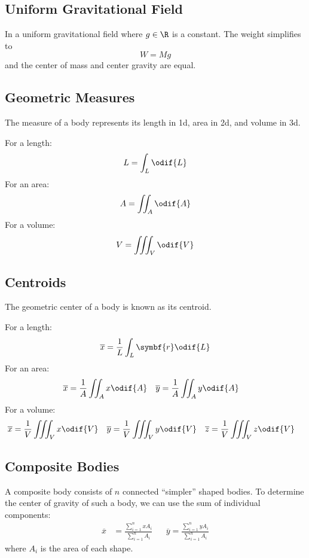 \documentclass{article}
\begin{document}
\subsection{Uniform Gravitational Field}
In a uniform gravitational field where \(g \in \R\) is a constant. The weight simplifies to
\begin{equation*}
    W = Mg
\end{equation*}
and the center of mass and center gravity are equal.
\subsection{Geometric Measures}
The measure of a body represents its length in 1d, area in 2d, and volume in 3d.

For a length:
\begin{equation*}
    L = \int_L \odif{L}
\end{equation*}
For an area:
\begin{equation*}
    A = \iint_A \odif{A}
\end{equation*}
For a volume:
\begin{equation*}
    V = \iiint_V \odif{V}
\end{equation*}
\subsection{Centroids}
The geometric center of a body is known as its centroid.

For a length:
\begin{equation*}
    \overline{x} = \frac{1}{L} \int_L \symbf{r} \odif{L}
\end{equation*}
For an area:
\begin{align*}
    \overline{x} & = \frac{1}{A} \iint_A x \odif{A} &  & \overline{y} = \frac{1}{A} \iint_A y \odif{A}
\end{align*}
For a volume:
\begin{align*}
    \overline{x} & = \frac{1}{V} \iiint_V x \odif{V} &  & \overline{y} = \frac{1}{V} \iiint_V y \odif{V} &  & \overline{z} = \frac{1}{V} \iiint_V z \odif{V}
\end{align*}
\subsection{Composite Bodies}
A composite body consists of \(n\) connected ``simpler'' shaped bodies.
To determine the center of gravity of such a body, we can use the sum of individual
components:
\begin{align*}
    \overline{x} & = \frac{\sum_{i = 1}^n x A_i}{\sum_{i = 1}^n A_i} &  & \overline{y} = \frac{\sum_{i = 1}^n y A_i}{\sum_{i = 1}^n A_i}
\end{align*}
where \(A_i\) is the area of each shape.
\end{document}
